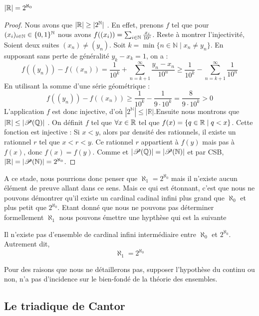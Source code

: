 \begin{proposition}
    $\left| \mathbb{R} \right| = 2^{\aleph_0}$
\end{proposition}
\begin{proof}
   Nous avons que $|\mathbb{R}|\ge |2^{\mathbb{N}}|$ . En effet, prenons $f$ tel que pour $(x_i)_{i\in \mathbb{N}}\in \{0,1\}^{\mathbb{N}}$ nous avons $f((x_i))= \sum_{i\in \mathbb{N}}\frac{x_i}{10^i}$. Reste à montrer l'injectivité, Soient deux suites $(x_n) \neq (y_n)$. Soit $k = \min\{n \in \mathbb{N} \mid x_n \neq y_n\}$. En supposant sans perte de généralité $y_k - x_k = 1$, on a :
\[ f((y_n)) - f((x_n)) = \frac{1}{10^k} + \sum_{n=k+1}^{\infty} \frac{y_n - x_n}{10^n} \geq \frac{1}{10^k} - \sum_{n=k+1}^{\infty} \frac{1}{10^n} \]
En utilisant la somme d'une série géométrique :
\[ f((y_n)) - f((x_n)) \geq \frac{1}{10^k} - \frac{1}{9 \cdot 10^k} = \frac{8}{9 \cdot 10^k} > 0 \]
L'application $f$ est donc injective, d'où $|2^{\mathbb{N}}| \leq |\mathbb{R}|$.Ensuite nous montrons que $|\mathbb{R}|\le |\mathscr{P}(\mathbb{Q})|$ . On définit $f$ tel que $\forall x\in \mathbb{R}$ tel que $f(x)=\{q\in \mathbb{R} \mid q<x\}$. Cette fonction est injective : Si $x<y$, alors par densité des rationnels, il existe un rationnel $r$ tel que $x<r<y$. Ce rationnel $r$ appartient à $f(y)$ mais pas à $f(x)$, donc $f(x)=f(y)$. Comme et $|\mathscr{P}(\mathbb{Q})|= |\mathscr{P}(\mathbb{N})|$ et par CSB, $|\mathbb{R}|= |\mathscr{P}(\mathbb{N})|= 2^{\aleph_0}$.
\end{proof}



A ce stade, nous pourrions donc penser que $\aleph_1= 2^{\aleph_0}$ mais il n'existe aucun élément de preuve allant dans ce sens. Mais ce qui est étonnant, c'est que nous ne pouvons démontrer qu'il existe un cardinal cadinal infini plus grand que $\aleph_0$ et plus petit que $2^{\aleph_0}$. Etant donné que nous ne pouvons pas déterminer formellement $\aleph_1$ nous pouvons émettre une hypthèse qui est la suivante

\begin{definition}
    Il n'existe pas d'ensemble de cardinal infini intermédiaire entre $\aleph_0$ et $2^{\aleph_0}$. Autrement dit, 
    \[
    \aleph_1= 2^{\aleph_0}
    \]
\end{definition}

Pour des raisons que nous ne détaillerons pas, supposer l'hypothèse du continu ou non, n'a pas d'incidence sur le bien-fondé de la théorie des ensembles.


\subsection{Le triadique de Cantor}


